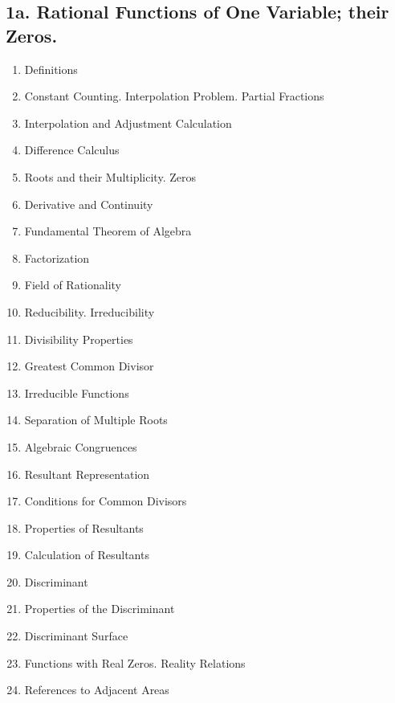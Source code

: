 \subsection*{\small1a. Rational Functions of One Variable; their Zeros. }

\begin{enumerate}[itemsep=0pt]
    \item Definitions
    \item Constant Counting. Interpolation Problem. Partial Fractions
    \item Interpolation and Adjustment Calculation
    \item Difference Calculus
    \item Roots and their Multiplicity. Zeros
    \item Derivative and Continuity
    \item Fundamental Theorem of Algebra
    \item Factorization
    \item Field of Rationality
    \item Reducibility. Irreducibility
    \item Divisibility Properties
    \item Greatest Common Divisor
    \item Irreducible Functions
    \item Separation of Multiple Roots
    \item Algebraic Congruences
    \item Resultant Representation
    \item Conditions for Common Divisors
    \item Properties of Resultants
    \item Calculation of Resultants
    \item Discriminant
    \item Properties of the Discriminant
    \item Discriminant Surface
    \item Functions with Real Zeros. Reality Relations
    \item References to Adjacent Areas
\end{enumerate}

